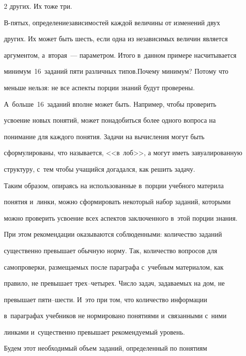 \begin{multicols}{2}
 других. Их тоже три.  


В-пя\-тых, определение\linebreak зависимостей каждой величины от изменений двух 


других. Их может быть шесть, если одна из независимых величин является 


аргументом, а~вторая~--- параметром. Итого в~данном примере насчитывается 


минимум~16~заданий пяти различных типов.\linebreak Почему минимум? Потому что 


меньше нельзя: не все аспекты порции знаний будут проверены. 


А~больше~16~заданий вполне может быть. Например, чтобы проверить 


усвоение новых понятий, может понадобиться более одного вопроса на 


понимание для каждого понятия. Задачи на вычисления могут быть 


сформулированы, что называется, <<в~лоб>>, а могут иметь завуалированную 


структуру, с~тем чтобы учащийся догадался, как решить задачу. 


  


  Таким образом, опираясь на использованные в~порции учебного материла 


понятия и~линки, можно сформировать некоторый набор заданий, которыми 


можно проверить усвоение всех аспектов заключенного в~этой порции знания. 


При этом рекомендации оказываются соблюденными: количество заданий 


существенно превышает обычную норму. Так, количество вопросов для 


самопроверки, размещаемых после параграфа с~учебным материалом, как 


правило, не превышает трех--че\-ты\-рех. Число задач, задаваемых на дом, не 


превышает пяти--шести. И~это при том, что количество информации 


в~параграфах учебников не нормировано понятиями и~связанными с~ними 


линками и~существенно превышает рекомендуемый уровень.


  


  Будем этот необходимый объем заданий, определенный по понятиям 



\end{multicols}
